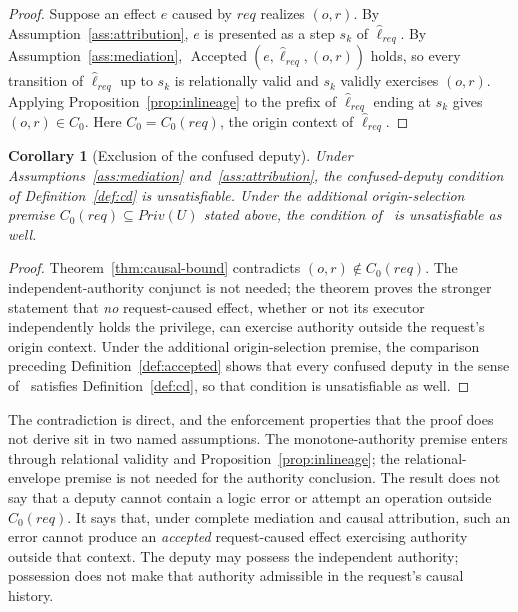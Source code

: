 \documentclass[10pt,twocolumn]{article}
\newtheorem{corollary}{Corollary}
\begin{document}
\begin{proof}
Suppose an effect \(e\) caused by \(req\) realizes \((o,r)\). By
Assumption~\ref{ass:attribution}, \(e\) is presented as a step \(s_k\) of
\(\widehat{\ell}_{req}\). By Assumption~\ref{ass:mediation},
\(\operatorname{Accepted}(e,\widehat{\ell}_{req},(o,r))\) holds, so every
transition of \(\widehat{\ell}_{req}\) up to \(s_k\) is relationally valid and \(s_k\) validly
exercises \((o,r)\). Applying Proposition~\ref{prop:inlineage} to the
prefix of \(\widehat{\ell}_{req}\) ending at \(s_k\) gives \((o,r)\in C_0\).
Here \(C_0=C_0(req)\), the origin context of
\(\widehat{\ell}_{req}\).
\end{proof}

\begin{corollary}[Exclusion of the confused deputy]\label{thm:cd}
Under Assumptions~\ref{ass:mediation} and~\ref{ass:attribution}, the
confused-deputy condition of Definition~\ref{def:cd} is unsatisfiable. Under
the additional origin-selection premise
\(C_0(req)\subseteq Priv(U)\) stated above, the condition
of~\cite{gallo2026poc} is unsatisfiable as well.
\end{corollary}

\begin{proof}
Theorem~\ref{thm:causal-bound} contradicts
\((o,r)\notin C_0(req)\). The independent-authority conjunct is not needed;
the theorem proves the stronger statement that \emph{no} request-caused effect,
whether or not its executor independently holds the privilege, can exercise
authority outside the request's origin context.
Under the additional origin-selection premise, the comparison preceding
Definition~\ref{def:accepted} shows that every confused deputy in the sense
of~\cite{gallo2026poc} satisfies Definition~\ref{def:cd}, so that condition is
unsatisfiable as well.
\end{proof}

The contradiction is direct, and the enforcement properties that the proof
does not derive sit in two named assumptions. The monotone-authority premise
enters through relational validity and Proposition~\ref{prop:inlineage}; the
relational-envelope premise is not needed for the authority conclusion.
The result does not say that a deputy cannot contain a logic error or attempt an
operation outside \(C_0(req)\). It says that, under complete mediation and
causal attribution, such an error cannot produce an \emph{accepted}
request-caused effect exercising authority outside that context.
The deputy may possess the independent authority; possession does not make that
authority admissible in the request's causal history.
\end{document}
